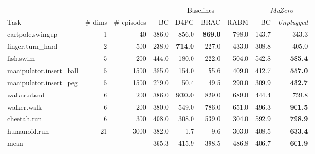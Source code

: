 \documentclass{article}
\newcommand{\muzero}{\emph{MuZero}}
\newcommand{\mzunplugged}{\emph{MuZero Unplugged}}
\begin{document}
\begin{table*}[h]
\begin{center}\begin{tabularx}{0.9\textwidth}{l@{\hspace{0pt}}rr|rrrr|rr}
  \toprule
   & & & \multicolumn{4}{c|}{Baselines} & \multicolumn{2}{c}{\muzero{}} \\
  Task & \# dims & \# episodes & BC & D4PG & BRAC & RABM & BC & \emph{Unplugged} \\
\midrule
cartpole.swingup & 1 & 40  & 386.0 & 856.0 & \textbf{869.0} & 798.0 & 143.7 & 343.3 \\
finger.turn\_hard & 2 & 500  & 238.0 & \textbf{714.0} & 227.0 & 433.0 & 308.8 & 405.0 \\
fish.swim & 5 & 200  & 444.0 & 180.0 & 222.0 & 504.0 & 542.8 & \textbf{585.4} \\
manipulator.insert\_ball & 5 & 1500  & 385.0 & 154.0 & 55.6 & 409.0 & 412.7 & \textbf{557.0} \\
manipulator.insert\_peg & 5 & 1500  & 279.0 & 50.4 & 49.5 & 290.0 & 309.9 & \textbf{432.7} \\
walker.stand & 6 & 200  & 386.0 & \textbf{930.0} & 829.0 & 689.0 & 444.4 & 759.8 \\
walker.walk & 6 & 200  & 380.0 & 549.0 & 786.0 & 651.0 & 496.3 & \textbf{901.5} \\
cheetah.run & 6 & 300  & 408.0 & 308.0 & 539.0 & 304.0 & 592.9 & \textbf{798.9} \\
humanoid.run & 21 & 3000  & 382.0 & 1.7 & 9.6 & 303.0 & 408.5 & \textbf{633.4} \\
\midrule
mean & &  & 365.3 & 415.9 & 398.5 & 486.8 & 406.7 & \textbf{601.9}\\
\bottomrule
\end{tabularx}
\end{center}
 \caption{
\label{tab:rl-unplugged-mujoco}
\textbf{Results for DM Control benchmark from RL Unplugged}. Mean final score on 9 DM Control tasks, as well as mean score across all tasks. First three columns indicate task, action dimensonality and dataset size, subsequent four columns reproduce baseline results from \cite{rl_unplugged}. Final columns show performance of Behaviour Cloning (BC) with the \muzero{} network and results for \mzunplugged{}. As the data sets for the DM Control tasks are very small and vary a hundredfold between tasks, to keep the number of model parameters per datapoint constant and prevent memorisation, we scaled the neural network according to .
}
\end{table*}
\end{document}
